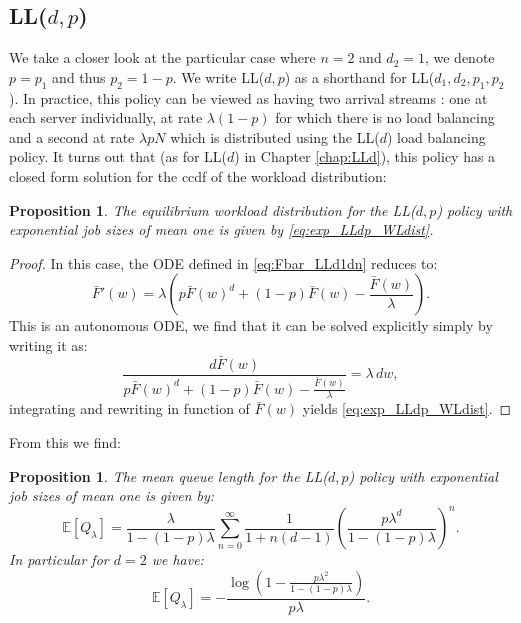 \documentclass[12pt]{report}
\newcommand{\E}{\mathbb{E}}
\newtheorem{proposition}[theorem]{Proposition}
\begin{document}
\subsection{LL($d,p$)}\label{sec:LLdp}
We take a closer look at the particular case where $n=2$ and $d_2=1$, we denote $p=p_1$ and thus $p_2=1-p$. We write LL($d,p$) as a shorthand for LL($d_1,d_2,p_1,p_2$). In practice, this policy can be viewed as having two arrival streams : one at each server individually, at rate $\lambda (1-p)$ for which 
there is no load balancing and a second at rate $\lambda p N$ which is distributed using the LL($d$) load balancing policy. It turns out that (as for LL($d$) in Chapter \ref{chap:LLd}), this policy has a closed form solution for the ccdf of the workload distribution:
\begin{proposition}
The equilibrium workload distribution for the LL($d,p$) policy with exponential job sizes of mean one is given by \eqref{eq:exp_LLdp_WLdist}.
\end{proposition}
\begin{proof}
In this case, the ODE defined in \eqref{eq:Fbar_LLd1dn} reduces to:
\begin{equation}
\bar F'(w)= \lambda \left(p\bar F(w)^d + (1-p) \bar F(w) - \frac{\bar F(w)}{\lambda} \right). \label{eq:proof_explicit1}
\end{equation}
This is an autonomous ODE, we find that it can be solved explicitly simply by writing it as:
$$
\frac{d \bar F(w)}{p\bar F(w)^d + (1-p) \bar F(w) - \frac{\bar F(w)}{\lambda}} = \lambda\, dw,
$$
integrating and rewriting in function of $\bar F(w)$ yields \eqref{eq:exp_LLdp_WLdist}.
\end{proof}
From this we find:
\begin{proposition} \label{prop:WL_LLd}
The mean queue length for the LL($d,p$) policy with exponential job sizes of mean one is given by:
\begin{equation}\label{eq:WL_LLd}
\E[Q_\lambda]=\frac{\lambda}{1-(1-p)\lambda} \sum_{n=0}^\infty \frac{1}{1+n(d-1)} \left( \frac{p \lambda^d}{1-(1-p)\lambda}\right)^n.
\end{equation}
In particular for $d=2$ we have:
$$
\E[Q_\lambda] = - \frac{\log\left( 1 - \frac{p \lambda^2}{1-(1-p) \lambda} \right)}{p \lambda}.
$$
\end{proposition}
\end{document}
